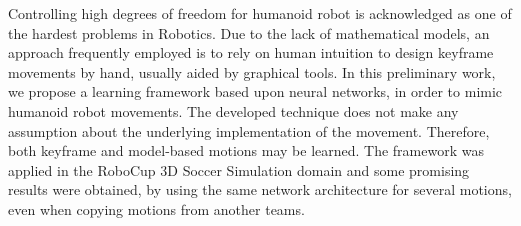Controlling high degrees of freedom for humanoid robot is acknowledged as one of the hardest problems in Robotics. Due to the lack of mathematical models, an approach frequently employed is to rely on human intuition to design keyframe movements by hand, usually aided by graphical tools. In this preliminary work, we propose a learning framework based upon neural networks, in order to mimic humanoid robot movements. The developed technique does not make any assumption about the underlying implementation of the movement. Therefore, both keyframe and model-based motions may be learned. The framework was applied in the RoboCup 3D Soccer Simulation domain and some promising results were obtained, by using the same network architecture for several motions, even when copying motions from another teams.